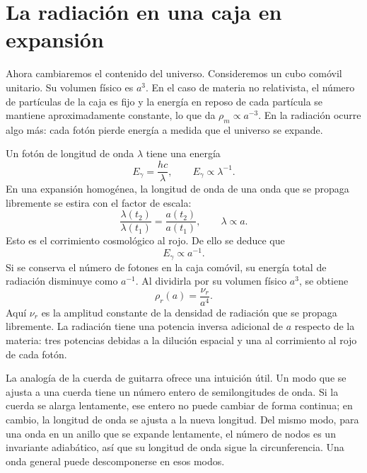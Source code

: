 \section{La radiación en una caja en expansión}

Ahora cambiaremos el contenido del universo. Consideremos un cubo comóvil unitario. Su volumen físico es \(a^3\). En el caso de materia no relativista, el número de partículas de la caja es fijo y la energía en reposo de cada partícula se mantiene aproximadamente constante, lo que da \(\rho_m\propto a^{-3}\). En la radiación ocurre algo más: cada fotón pierde energía a medida que el universo se expande.

Un fotón de longitud de onda \(\lambda\) tiene una energía
\begin{equation}
E_\gamma=\frac{hc}{\lambda},
\qquad
E_\gamma\propto\lambda^{-1}.
\label{eq:c02-photon-energy}
\end{equation}
En una expansión homogénea, la longitud de onda de una onda que se propaga libremente se estira con el factor de escala:
\begin{equation}
\frac{\lambda(t_2)}{\lambda(t_1)}
=\frac{a(t_2)}{a(t_1)},
\qquad
\lambda\propto a.
\label{eq:c02-redshift}
\end{equation}
Esto es el corrimiento cosmológico al rojo. De ello se deduce que
\begin{equation}
E_\gamma\propto a^{-1}.
\label{eq:c02-photon-redshift}
\end{equation}
Si se conserva el número de fotones en la caja comóvil, su energía total de radiación disminuye como \(a^{-1}\). Al dividirla por su volumen físico \(a^3\), se obtiene
\begin{equation}
\boxed{\rho_r(a)=\frac{\nu_r}{a^4}.}
\label{eq:c02-radiation-density}
\end{equation}
Aquí \(\nu_r\) es la amplitud constante de la densidad de radiación que se propaga libremente. La radiación tiene una potencia inversa adicional de \(a\) respecto de la materia: tres potencias debidas a la dilución espacial y una al corrimiento al rojo de cada fotón.

La analogía de la cuerda de guitarra ofrece una intuición útil. Un modo que se ajusta a una cuerda tiene un número entero de semilongitudes de onda. Si la cuerda se alarga lentamente, ese entero no puede cambiar de forma continua; en cambio, la longitud de onda se ajusta a la nueva longitud. Del mismo modo, para una onda en un anillo que se expande lentamente, el número de nodos es un invariante adiabático, así que su longitud de onda sigue la circunferencia. Una onda general puede descomponerse en esos modos.

